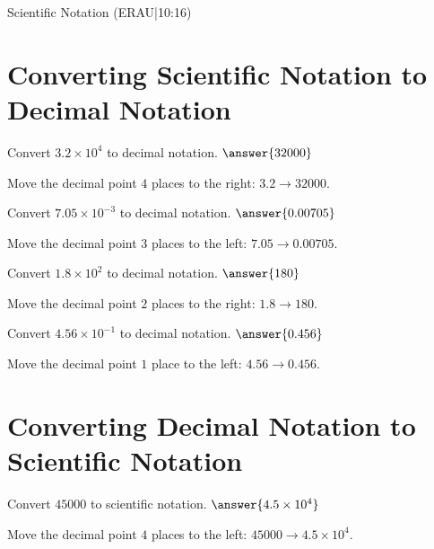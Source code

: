 \documentclass{ximera}
\begin{document}
Scientific Notation (ERAU|10:16)



\section*{Converting Scientific Notation to Decimal Notation}

\begin{problem}
Convert $3.2 \times 10^4$ to decimal notation. $\answer{32000}$
\begin{feedback}
Move the decimal point $4$ places to the right: $3.2 \rightarrow 32000$.
\end{feedback}
\end{problem}

\begin{problem}
Convert $7.05 \times 10^{-3}$ to decimal notation. $\answer{0.00705}$
\begin{feedback}
Move the decimal point $3$ places to the left: $7.05 \rightarrow 0.00705$.
\end{feedback}
\end{problem}

\begin{problem}
Convert $1.8 \times 10^2$ to decimal notation. $\answer{180}$
\begin{feedback}
Move the decimal point $2$ places to the right: $1.8 \rightarrow 180$.
\end{feedback}
\end{problem}

\begin{problem}
Convert $4.56 \times 10^{-1}$ to decimal notation. $\answer{0.456}$
\begin{feedback}
Move the decimal point $1$ place to the left: $4.56 \rightarrow 0.456$.
\end{feedback}
\end{problem}



\section*{Converting Decimal Notation to Scientific Notation}

\begin{problem}
Convert $45000$ to scientific notation. $\answer{4.5 \times 10^4}$
\begin{feedback}
Move the decimal point $4$ places to the left: $45000 \rightarrow 4.5 \times 10^4$.
\end{feedback}
\end{problem}
\end{document}
